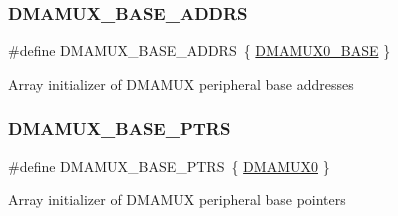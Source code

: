 \subsubsection{\texorpdfstring{DMAMUX\_BASE\_ADDRS}{DMAMUX\_BASE\_ADDRS}}
{\footnotesize\ttfamily \#define D\+M\+A\+M\+U\+X\+\_\+\+B\+A\+S\+E\+\_\+\+A\+D\+D\+RS~\{ \mbox{\hyperlink{group___d_m_a_m_u_x___peripheral___access___layer_ga53dad94854927e3f0d04159ddae91b12}{D\+M\+A\+M\+U\+X0\+\_\+\+B\+A\+SE}} \}}

Array initializer of D\+M\+A\+M\+UX peripheral base addresses \mbox{\label{group___d_m_a_m_u_x___peripheral___access___layer_gaad218c12978071501dc2899f0624de4b}} 
\subsubsection{\texorpdfstring{DMAMUX\_BASE\_PTRS}{DMAMUX\_BASE\_PTRS}}
{\footnotesize\ttfamily \#define D\+M\+A\+M\+U\+X\+\_\+\+B\+A\+S\+E\+\_\+\+P\+T\+RS~\{ \mbox{\hyperlink{group___d_m_a_m_u_x___peripheral___access___layer_gab65f26d32cad2fbb14838d5c831203ec}{D\+M\+A\+M\+U\+X0}} \}}

Array initializer of D\+M\+A\+M\+UX peripheral base pointers 